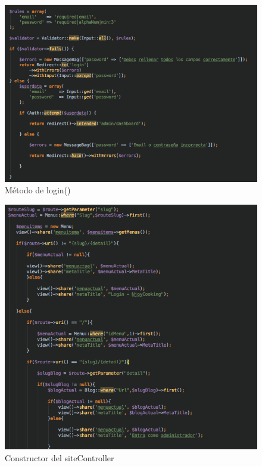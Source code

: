 \begin{figure}
\begin{center}
\includegraphics[width=1.0\textwidth]{imagenes/controller-login.png}
\caption{Método de login()}
\label{controller-login}
\end{center}
\end{figure}

\begin{figure}
\begin{center}
\includegraphics[width=1.0\textwidth]{imagenes/site-construct.png}
\caption{Constructor del siteController}
\label{site-construct}
\end{center}
\end{figure}

